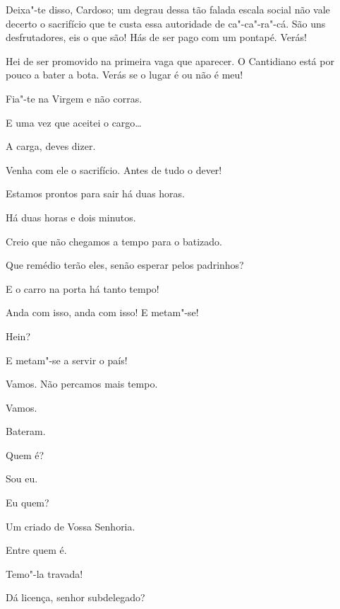  Deixa"-te disso, Cardoso; um degrau dessa tão falada escala social
não vale decerto o sacrifício que te custa essa autoridade de ca"-ca"-ra"-cá. São
uns desfrutadores, eis o que são! Hás de ser pago com um pontapé. Verás!

 Hei de ser promovido na primeira vaga que aparecer. O
Cantidiano está por pouco a bater a bota. Verás se o lugar é ou não é meu!

 Fia"-te na Virgem e não corras.

 E uma vez que aceitei o cargo\ldots{}

 A carga, deves dizer.

 Venha com ele o sacrifício. Antes de tudo o dever!

 Estamos prontos para sair há duas horas.

  Há duas horas e
dois minutos.

  Creio que não chegamos a
tempo para o batizado.

 Que remédio terão eles, senão esperar pelos padrinhos?

 E o carro na porta há tanto tempo!

 Anda com isso, anda com isso! E metam"-se!

 Hein?

 E metam"-se a servir o país!

 Vamos. Não percamos mais tempo.

 Vamos. 

 Bateram.

 Quem é?

  Sou eu.

 Eu quem?

  Um criado de Vossa Senhoria.

 Entre quem é.

 Temo"-la travada! 

{}


  Dá licença, senhor
subdelegado?

